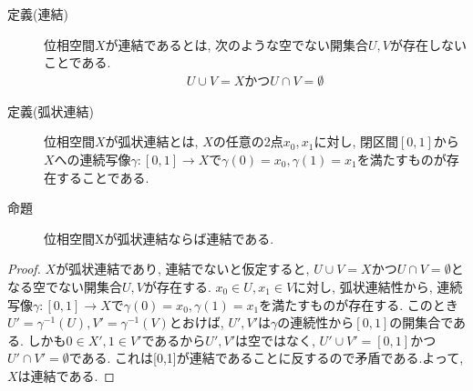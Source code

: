 \documentclass[i]{jsarticle}
\begin{document}
\begin{description}
  \item[定義(連結)] 位相空間$X$が連結であるとは, 次のような空でない開集合$U, V$が存在しないことである.
  \begin{align*}
    U \cup V = X かつ U \cap V = \emptyset
  \end{align*}
\end{description}
\begin{description}
  \item[定義(弧状連結)] 位相空間$X$が弧状連結とは, $X$の任意の2点$x_{0}, x_{1}$に対し, 閉区間$[0,1]$から$X$への連続写像$\gamma:[0,1]\to X$で$\gamma(0)=x_{0}, \gamma(1)=x_{1}$を満たすものが存在することである.
\end{description}
\begin{description}
  \item[命題] 位相空間Xが弧状連結ならば連結である.
\end{description}
\begin{proof}
$X$が弧状連結であり, 連結でないと仮定すると, $U \cup V = X$かつ$U \cap V = \emptyset$となる空でない開集合$U, V$が存在する.
$x_{0}\in U, x_{1}\in V$に対し, 弧状連結性から, 連続写像$\gamma:[0,1]\to X$で$\gamma(0)=x_{0}, \gamma(1)=x_{1}$を満たすものが存在する.
このとき$U'=\gamma^{-1}(U), V'=\gamma^{-1}(V)$とおけば, $U', V'$は$\gamma$の連続性から$[0,1]$の開集合である.
しかも$0\in X', 1\in V'$であるから$U', V'$は空ではなく, $U' \cup V'=[0,1]$かつ$U'\cap V'=\emptyset$である.
これは[0,1]が連結であることに反するので矛盾である.よって, $X$は連結である.
\end{proof}
\end{document}
